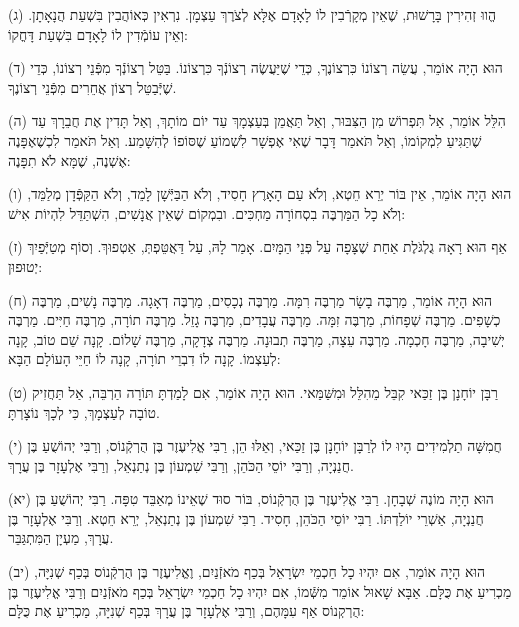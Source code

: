 \documentclass[twoside, openany, parskip=half, 11pt]{book}
\begin{document}
(ג) הֱווּ זְהִירִין בָּרָשׁוּת, שֶׁאֵין מְקָרְֿבִין לוֹ לָאָדָם אֶלָּא לְצֹרֶךְ עַצְמָן. נִרְאִין כְּאוֹהֲבִין בִּשְׁעַת הֲנָאָתָן. וְאֵין עוֹמְֿדִין לוֹ לָאָדָם בִּשְׁעַת דָּחֳקוֹ:

(ד) הוּא הָיָה אוֹמֵר, עֲשֵׂה רְצוֹנוֹ כִּרְצוֹנֶךָ, כְּדֵי שֶׁיַּעֲשֶׂה רְצוֹנְֿךָ כִּרְצוֹנוֹ. בַּטֵּל רְצוֹנְֿךָ מִפְּֿנֵי רְצוֹנוֹ, כְּדֵי שֶׁיְּֿבַטֵּל רְצוֹן אֲחֵרִים מִפְּֿנֵי רְצוֹנֶךָ.

(ה) הִלֵּל אוֹמֵר, אַל תִּפְרוֹשׁ מִן הַצִּבּוּר, וְאַל תַּאֲמֵן בְּעַצְמָךְ עַד יוֹם מוֹתָךְ, וְאַל תָּדִין אֶת חֲבֵרָךְ עַד שֶׁתַּגִּיעַ לִמְקוֹמוֹ, וְאַל תֹּאמַר דָּבָר שֶׁאִי אֶפְשָׁר לִשְׁמוֹעַ שֶׁסּוֹפוֹ לְהִשָּׁמַע. וְאַל תֹּאמַר לִכְשֶׁאֶפָּנֶה אֶשְׁנֶה, שֶׁמָּא לֹא תִפָּנֶה:

(ו) הוּא הָיָה אוֹמֵר, אֵין בּוֹר יְרֵא חֵטְא, וְלֹא עַם הָאָרֶץ חָסִיד, וְלֹא הַבַּיְּֿשָׁן לָמֵד, וְלֹא הַקַּפְּֿדָן מְלַמֵּד, וְלֹא כָל הַמַּרְבֶּה בִסְחוֹרָה מַחְכִּים. ובִמְקוֹם שֶׁאֵין אֲנָשִׁים, הִשְׁתַּדֵּל לִהְיוֹת אִישׁ:

(ז) אַף הוּא רָאָה גֻלְגֹּלֶת אַחַת שֶׁצָּפָה עַל פְּנֵי הַמָּיִם. אָמַר לָהּ, עַל דַּאֲטֵּפְתְּ, אַטְפוּךְ. וְסוֹף מְטַיְּֿפַיִךְ יְטוּפוּן:

(ח) הוּא הָיָה אוֹמֵר,
מַרְבֶּה בָשָׂר מַרְבֶּה רִמָּה.
מַרְבֶּה נְכָסִים, מַרְבֶּה דְאָגָה.
מַרְבֶּה נָשִׁים, מַרְבֶּה כְשָׁפִים.
מַרְבֶּה שְׁפָחוֹת, מַרְבֶּה זִמָּה.
מַרְבֶּה עֲבָדִים, מַרְבֶּה גָזֵל.
מַרְבֶּה תוֹרָה, מַרְבֶּה חַיִּים.
מַרְבֶּה יְשִׁיבָה, מַרְבֶּה חָכְמָה.
מַרְבֶּה עֵצָה, מַרְבֶּה תְבוּנָה.
מַרְבֶּה צְדָקָה, מַרְבֶּה שָׁלוֹם.
קָנָה שֵׁם טוֹב, קָנָה לְעַצְמוֹ. קָנָה לוֹ דִבְרֵי תוֹרָה, קָנָה לוֹ חַיֵּי הָעוֹלָם הַבָּא:

(ט) רַבָּן יוֹחָנָן בֶּן זַכַּאי קִבֵּל מֵהִלֵּל וּמִשַּׁמַּאי. הוּא הָיָה אוֹמֵר, אִם לָמַדְתָּ תּוֹרָה הַרְבֵּה, אַל תַּחֲזִיק טוֹבָה לְעַצְמָךְ, כִּי לְכָךְ נוֹצָרְתָּ.

(י)
חֲמִשָּׁה תַלְמִידִים הָיוּ לוֹ לְרַבָּן יוֹחָנָן בֶּן זַכַּאי, וְאֵלּוּ הֵן,
רַבִּי אֱלִיעֶזֶר בֶּן הֻרְקְֿנוֹס,
וְרַבִּי יְהוֹשֻׁעַ בֶּן חֲנַנְיָה,
וְרַבִּי יוֹסֵי הַכֹּהֵן,
וְרַבִּי שִׁמְעוֹן בֶּן נְתַנְאֵל,
וְרַבִּי אֶלְעָזָר בֶּן עֲרָךְ.

(יא)
הוּא הָיָה מוֹנֶה שְׁבָחָן.
רַבִּי אֱלִיעֶזֶר בֶּן הֻרְקְֿנוֹס, בּוֹר סוּד שֶׁאֵינוֹ מְאַבֵּד טִפָּה.
רַבִּי יְהוֹשֻׁעַ בֶּן חֲנַנְיָה, אַשְׁרֵי יוֹלַדְתּוֹ.
רַבִּי יוֹסֵי הַכֹּהֵן, חָסִיד.
רַבִּי שִׁמְעוֹן בֶּן נְתַנְאֵל, יְרֵא חֵטְא.
וְרַבִּי אֶלְעָזָר בֶּן עֲרָךְ, מַעְיָן הַמִּתְגַּבֵּר.

(יב)
הוּא הָיָה אוֹמֵר, אִם יִהְיוּ כָל חַכְמֵי יִשְׂרָאֵל בְּכַף מֹאזְֿנַיִם, וֶאֱלִיעֶזֶר בֶּן הֻרְקְֿנוֹס בְּכַף שְׁנִיָּה, מַכְרִיעַ אֶת כֻּלָּם. אַבָּא שָׁאוּל אוֹמֵר מִשְּֿׁמוֹ, אִם יִהְיוּ כָל חַכְמֵי יִשְׂרָאֵל בְּכַף מֹאזְֿנַיִם וְרַבִּי אֱלִיעֶזֶר בֶּן הֻרְקְנוֹס אַף עִמָּהֶם, וְרַבִּי אֶלְעָזָר בֶּן עֲרָךְ בְּכַף שְׁנִיָּה, מַכְרִיעַ אֶת כֻּלָּם:
\end{document}
